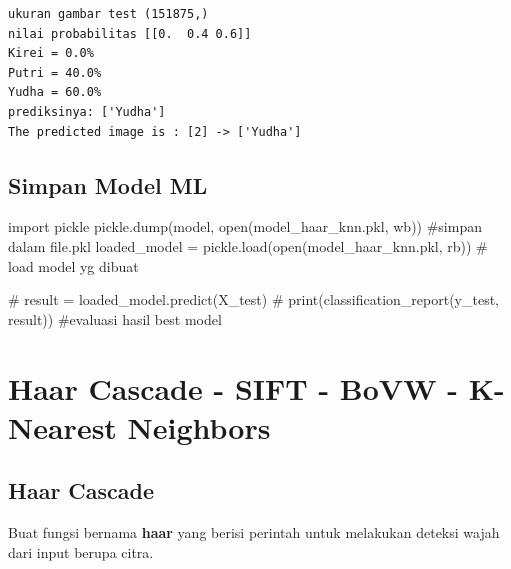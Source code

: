 \documentclass[
  letterpaper,
  DIV=11,
  numbers=noendperiod]{scrreprt}
\newenvironment{Shaded}{\begin{snugshade}}{\end{snugshade}}
\newcommand{\BuiltInTok}[1]{\textcolor[rgb]{0.00,0.23,0.31}{#1}}
\newcommand{\CommentTok}[1]{\textcolor[rgb]{0.37,0.37,0.37}{#1}}
\newcommand{\ImportTok}[1]{\textcolor[rgb]{0.00,0.46,0.62}{#1}}
\newcommand{\NormalTok}[1]{\textcolor[rgb]{0.00,0.23,0.31}{#1}}
\newcommand{\OperatorTok}[1]{\textcolor[rgb]{0.37,0.37,0.37}{#1}}
\newcommand{\StringTok}[1]{\textcolor[rgb]{0.13,0.47,0.30}{#1}}
\begin{document}
\begin{verbatim}
ukuran gambar test (151875,)
nilai probabilitas [[0.  0.4 0.6]]
Kirei = 0.0%
Putri = 40.0%
Yudha = 60.0%
prediksinya: ['Yudha']
The predicted image is : [2] -> ['Yudha'] 
\end{verbatim}

\hypertarget{simpan-model-ml}{%
\subsection*{Simpan Model ML}\label{simpan-model-ml}}

\begin{Shaded}
\begin{Highlighting}[]
\ImportTok{import}\NormalTok{ pickle}
\NormalTok{pickle.dump(model, }\BuiltInTok{open}\NormalTok{(}\StringTok{\textquotesingle{}model\_haar\_knn.pkl\textquotesingle{}}\NormalTok{, }\StringTok{\textquotesingle{}wb\textquotesingle{}}\NormalTok{)) }\CommentTok{\#simpan dalam file.pkl}
\NormalTok{loaded\_model }\OperatorTok{=}\NormalTok{ pickle.load(}\BuiltInTok{open}\NormalTok{(}\StringTok{\textquotesingle{}model\_haar\_knn.pkl\textquotesingle{}}\NormalTok{, }\StringTok{\textquotesingle{}rb\textquotesingle{}}\NormalTok{)) }\CommentTok{\# load model yg dibuat}

\CommentTok{\# result = loaded\_model.predict(X\_test) }
\CommentTok{\# print(classification\_report(y\_test, result)) \#evaluasi hasil best model}
\end{Highlighting}
\end{Shaded}

\hypertarget{haar-cascade---sift---bovw---k-nearest-neighbors}{%
\section*{Haar Cascade - SIFT - BoVW - K-Nearest
Neighbors}\label{haar-cascade---sift---bovw---k-nearest-neighbors}}


\hypertarget{haar-cascade}{%
\subsection*{Haar Cascade}\label{haar-cascade}}

Buat fungsi bernama \textbf{haar} yang berisi perintah untuk melakukan
deteksi wajah dari input berupa citra.
\end{document}
